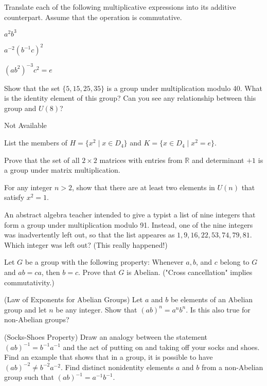 \documentclass[11pt,largemargins]{homework}
\begin{document}
\question
Translate each of the following multiplicative expressions into its additive counterpart. Assume that the operation 
is commutative.

\begin{alphaparts}
    \questionpart
    $a^2b^3$

    \questionpart
    $a^{-2}(b^{-1}c)^2$

    \questionpart
    $(ab^2)^{-3}c^2=e$

\end{alphaparts}

\question
Show that the set $\{5, 15, 25, 35\}$ is a group under multiplication modulo 40. What is the identity element of this group?
Can you see any relationship between this group and $U(8)$?

\question
Not Available

\question
List the members of $H=\{x^2\;|\; x \in D_4 \}$ and $K=\{x\in D_4 \;|\; x^2=e \}$.

\question
Prove that the set of all $2\times2$ matrices with entries from $\mathbb{R}$ and determinant $+1$ is a group under matrix
multiplication.

\question
For any integer $n>2$, show that there are at least two elements in $U(n)$ that satisfy $x^2=1$.

\question
An abstract algebra teacher intended to give a typist a list of nine integers that form a group under multiplication 
modulo 91. Instead, one of the nine integers was inadvertently left out, so that the list appeares as 
$1, 9, 16, 22, 53, 74, 79, 81$. Which integer was left out? (This really happened!)

\question
Let $G$ be a group with the following property: Whenever $a,b$, and $c$ belong to $G$ and $ab=ca$, then $b=c$. 
Prove that $G$ is Abelian. ("Cross cancellation" implies commutativity.)

\question
(Law of Exponents for Abelian Groups) Let $a$ and $b$ be elements of an Abelian group and let $n$ be any integer. Show 
that $(ab)^n=a^nb^n$. Is this also true for non-Abelian groups?

\question
(Socks-Shoes Property) Draw an analogy between the statement $(ab)^{-1}=b^{-1}a^{-1}$ and the act of putting on and taking off 
your socks and shoes. Find an example that shows that in a group, it is possible to have $(ab)^{-2}\neq b^{-2}a^{-2}$. 
Find distinct nonidentity elements $a$ and $b$ from a non-Abelian group such that $(ab)^{-1}=a^{-1}b^{-1}$.
\end{document}
